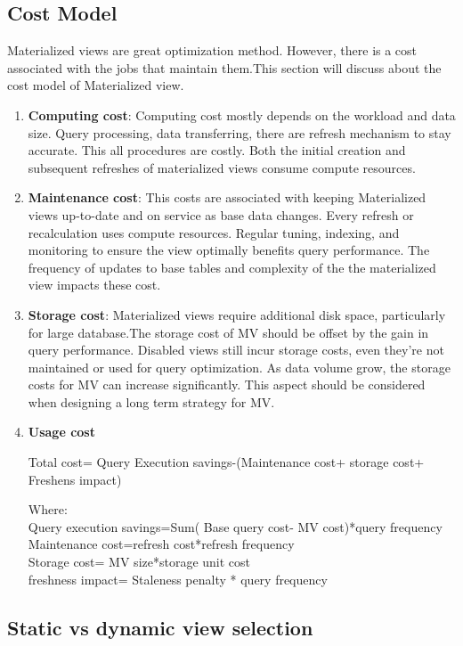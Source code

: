  \subsection{Cost Model}
Materialized views are great optimization method. However, there is a cost associated with the jobs that maintain them.This section will discuss about the cost model of Materialized view.
 \begin{enumerate}[label=\alph*)]
    \item \textbf{Computing cost}: Computing cost mostly depends on the workload and data size. Query processing, data transferring, there are refresh mechanism to stay accurate. This all procedures are costly. Both the initial creation and subsequent refreshes of materialized views consume compute resources.
    \item \textbf{Maintenance cost}: This costs are associated with keeping Materialized views up-to-date and on service as base data changes. Every refresh or recalculation uses compute resources. Regular tuning, indexing, and monitoring to ensure the view optimally benefits query performance. The frequency of updates to base tables and complexity of the the materialized view impacts these cost. 
    \item \textbf{Storage cost}: Materialized views require additional disk space, particularly for large database.The storage cost of MV should be offset by the gain in query performance. Disabled views  still incur storage costs, even  they're not maintained or used for query optimization. As data volume grow, the storage costs for MV can increase significantly. This  aspect should be considered when designing a long term strategy for MV. 
    
    \item \textbf{Usage cost}
    
  Total cost= Query Execution savings-(Maintenance cost+ storage cost+ Freshens impact)

  Where:\\
  Query execution savings=Sum( Base query cost- MV cost)*query frequency \\
  Maintenance cost=refresh cost*refresh frequency\\
  Storage cost= MV size*storage unit cost\\
  freshness impact= Staleness penalty * query frequency\\
  
\end{enumerate}
 \cite{10.1145/2206869.2206874}
 \subsection{ Static vs dynamic view selection }
